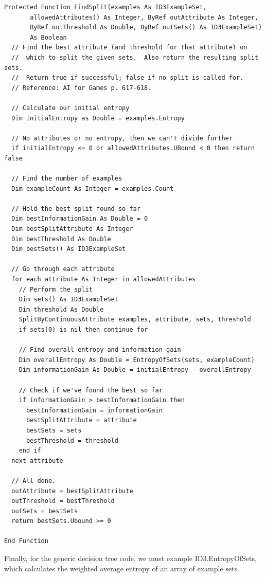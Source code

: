 \documentclass{article}
\begin{document}
\begin{lstlisting}
Protected Function FindSplit(examples As ID3ExampleSet,
       allowedAttributes() As Integer, ByRef outAttribute As Integer,
       ByRef outThreshold As Double, ByRef outSets() As ID3ExampleSet)
       As Boolean
  // Find the best attribute (and threshold for that attribute) on
  //  which to split the given sets.  Also return the resulting split sets.
  //  Return true if successful; false if no split is called for.
  // Reference: AI for Games p. 617-618.
  
  // Calculate our initial entropy
  Dim initialEntropy as Double = examples.Entropy
  
  // No attributes or no entropy, then we can't divide further
  if initialEntropy <= 0 or allowedAttributes.UBound < 0 then return false
  
  // Find the number of examples
  Dim exampleCount As Integer = examples.Count
  
  // Hold the best split found so far
  Dim bestInformationGain As Double = 0
  Dim bestSplitAttribute As Integer
  Dim bestThreshold As Double
  Dim bestSets() As ID3ExampleSet
  
  // Go through each attribute
  for each attribute As Integer in allowedAttributes
    // Perform the split
    Dim sets() As ID3ExampleSet
    Dim threshold As Double
    SplitByContinuousAttribute examples, attribute, sets, threshold
    if sets(0) is nil then continue for
    
    // Find overall entropy and information gain
    Dim overallEntropy As Double = EntropyOfSets(sets, exampleCount)
    Dim informationGain As Double = initialEntropy - overallEntropy
    
    // Check if we've found the best so far
    if informationGain > bestInformationGain then
      bestInformationGain = informationGain
      bestSplitAttribute = attribute
      bestSets = sets
      bestThreshold = threshold
    end if
  next attribute
  
  // All done.
  outAttribute = bestSplitAttribute
  outThreshold = bestThreshold
  outSets = bestSets
  return bestSets.Ubound >= 0
  
End Function
\end{lstlisting}

Finally, for the generic decision tree code, we must example ID3.EntropyOfSets, which calculates the weighted average entropy of an array of example sets.
\end{document}

